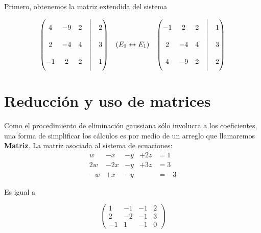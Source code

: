 \documentclass[
]{article}
\begin{document}
Primero, obtenemos la matriz extendida del sistema

\begin{equation*}
 \begin{array}{ccc}
    \begin{pmatrix}
                  4   & -9  &   2  &\biggm|& 2   \\
                  2   & -4  &   4  &\biggm|& 3   \\
                  -1  &  2  &   2  &\biggm|& 1
                     \end{pmatrix} & 
    \begin{matrix} 
      (E_3 \leftrightarrow E_1   ) \\
    \end{matrix}
    & 
    \begin{pmatrix}
                 -1   &  2  &  2  &\biggm|& 1   \\
                  2   & -4  &  4  &\biggm|& 3   \\
                  4   & -9  &  2  &\biggm|& 2
    \end{pmatrix}
 \end{array}
\end{equation*}

\hypertarget{reducciuxf3n-y-uso-de-matrices}{%
\section{Reducción y uso de
matrices}\label{reducciuxf3n-y-uso-de-matrices}}

\small

Como el procedimiento de eliminación gaussiana sólo involucra a los
coeficientes, una forma de simplificar los cálculos es por medio de un
arreglo que llamaremos \textbf{Matriz}. La matriz asociada al sistema de
ecuaciones: \begin{equation*}
  \begin{matrix}
        w   & - x  & - y  & +2z & = 1  \\
     2 w    & - 2x & - y  & +3z & = 3   \\
      -w    & + x  &  -y  &     &=-3
  \end{matrix}
\end{equation*}

Es igual a

\begin{equation*}
  \begin{pmatrix}
        1   & - 1 & - 1  & 2   \\
        2   & - 2 & - 1  & 3    \\
      - 1   &   1 &  -1  & 0 
  \end{pmatrix}
\end{equation*}
\end{document}
